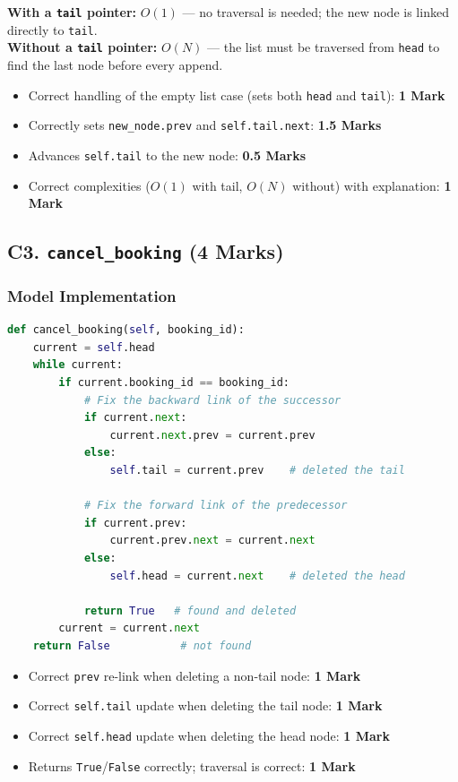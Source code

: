 \documentclass[11pt,a4paper]{article}
\newenvironment{markbox}[1]{%
    \begin{tcolorbox}[colback=markgreen!6!white, colframe=markgreen, title=\textbf{Mark Allocation --- #1}]
}{%
    \end{tcolorbox}
}
\begin{document}
\textbf{With a \texttt{tail} pointer:} $O(1)$ --- no traversal is needed; the new node is linked directly to \texttt{tail}. \\
\textbf{Without a \texttt{tail} pointer:} $O(N)$ --- the list must be traversed from \texttt{head} to find the last node before every append.

\begin{markbox}{C2 --- 4 Marks}
\begin{itemize}
    \item Correct handling of the empty list case (sets both \texttt{head} and \texttt{tail}): \textbf{1 Mark}
    \item Correctly sets \texttt{new\_node.prev} and \texttt{self.tail.next}: \textbf{1.5 Marks}
    \item Advances \texttt{self.tail} to the new node: \textbf{0.5 Marks}
    \item Correct complexities ($O(1)$ with tail, $O(N)$ without) with explanation: \textbf{1 Mark}
\end{itemize}
\end{markbox}

\newpage

\subsection*{C3. \texttt{cancel\_booking} (4 Marks)}

\subsubsection*{Model Implementation}
\begin{lstlisting}[language=Python]
def cancel_booking(self, booking_id):
    current = self.head
    while current:
        if current.booking_id == booking_id:
            # Fix the backward link of the successor
            if current.next:
                current.next.prev = current.prev
            else:
                self.tail = current.prev    # deleted the tail

            # Fix the forward link of the predecessor
            if current.prev:
                current.prev.next = current.next
            else:
                self.head = current.next    # deleted the head

            return True   # found and deleted
        current = current.next
    return False           # not found
\end{lstlisting}

\begin{markbox}{C3 --- 4 Marks}
\begin{itemize}
    \item Correct \texttt{prev} re-link when deleting a non-tail node: \textbf{1 Mark}
    \item Correct \texttt{self.tail} update when deleting the tail node: \textbf{1 Mark}
    \item Correct \texttt{self.head} update when deleting the head node: \textbf{1 Mark}
    \item Returns \texttt{True}/\texttt{False} correctly; traversal is correct: \textbf{1 Mark}
\end{itemize}
\end{markbox}
\end{document}
